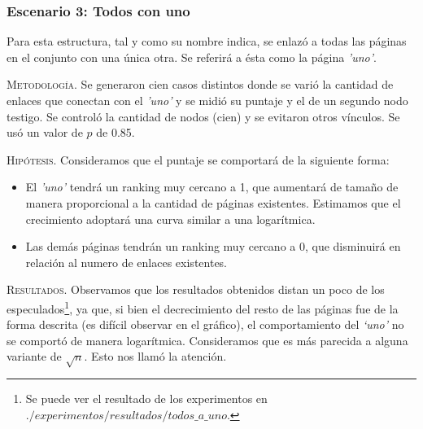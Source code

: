 \newpage
\subsubsection{Escenario 3: Todos con uno} Para esta estructura, tal y como su nombre indica, se enlazó a todas las páginas en el conjunto con una única otra. Se referirá a ésta como la página \textit{'uno'}.

\vspace{1em}

\vspace{1em}
\noindent \textsc{Metodología}. Se generaron cien casos distintos donde se varió la cantidad de enlaces que conectan con el \textit{'uno'} y se midió su puntaje y el de un segundo nodo testigo. Se controló la cantidad de nodos (cien) y se evitaron otros vínculos. Se usó un valor de $p$ de 0.85.

\vspace{1em}
\noindent \textsc{Hipótesis}. Consideramos que el puntaje se comportará de la siguiente forma:
\begin{itemize}
\item El \textit{'uno'} tendrá un ranking muy cercano a 1, que aumentará de tamaño de manera proporcional a la cantidad de páginas existentes. Estimamos que el crecimiento adoptará una curva similar a una logarítmica.
\item Las demás páginas tendrán un ranking muy cercano a 0, que disminuirá en relación al numero de enlaces existentes. %
\end{itemize}

\vspace{1em}

\vspace{1em}
\noindent \textsc{Resultados}. Observamos que los resultados obtenidos distan un poco de los especulados\footnote{Se puede ver el resultado de los experimentos en $./experimentos/resultados/todos\_a\_uno$.}, ya que, si bien el decrecimiento del resto de las páginas fue de la forma descrita (es difícil observar en el gráfico), el comportamiento del \textit{`uno'} no se comportó de manera logarítmica. Consideramos que es más parecida a alguna variante de $\sqrt{n}$. Esto nos llamó la atención.











